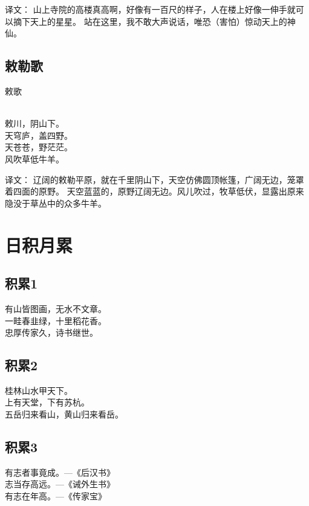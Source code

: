 译文：
山上寺院的高楼真高啊，好像有一百尺的样子，人在楼上好像一伸手就可以摘下天上的星星。
站在这里，我不敢大声说话，唯恐（害怕）惊动天上的神仙。

\subsection{敕勒歌}
\begin{pinyinscope}
\noindent  \huge 敕歌

 \\

\noindent 敕川，阴山下。\\天穹庐，盖四野。\\
天苍苍，野茫茫。\\风吹草低牛羊。
\end{pinyinscope}

译文：
辽阔的敕勒平原，就在千里阴山下，天空仿佛圆顶帐篷，广阔无边，笼罩着四面的原野。
天空蓝蓝的，原野辽阔无边。风儿吹过，牧草低伏，显露出原来隐没于草丛中的众多牛羊。

\section{日积月累}
\subsection{积累1}
\begin{pinyinscope}
	\huge
	\noindent 有山皆图画，无水不文章。\\
	一畦春韭绿，十里稻花香。\\
	忠厚传家久，诗书继世。
\end{pinyinscope}

\subsection{积累2}
\begin{pinyinscope}
	\huge
	\noindent 桂林山水甲天下。\\
	上有天堂，下有苏杭。\\
	五岳归来看山，黄山归来看岳。
\end{pinyinscope}

\subsection{积累3}
\begin{pinyinscope}
	\huge
	\noindent 有志者事竟成。---{\kaishu \large 《后汉书》}\\
	志当存高远。---{\kaishu \large 《诫外生书》}\\
	有志在年高。---{\kaishu \large 《传家宝》}\\
\end{pinyinscope}

